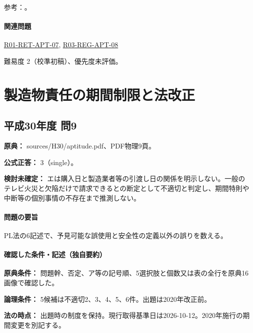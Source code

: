 \par 参考：\cite{pl_statute,pl_qa,pl_definitions2018,pl_nuclear_statute}。

\paragraph{関連問題} \hyperref[q:r01-ret-apt-07]{R01-RET-APT-07}, \hyperref[q:r03-reg-apt-08]{R03-REG-APT-08}

\par 難易度 2（校準初稿）、優先度未評価。

\section{製造物責任の期間制限と法改正}

\subsection{平成30年度 問9}
\label{q:h30-reg-apt-09}

\noindent\textbf{原典：} sources/H30/aptitude.pdf、PDF物理9頁。

\textbf{公式正答：} 3（single）。

\par\textbf{検討未確定：} エは購入日と製造業者等の引渡し日の関係を明示しない。一般のテレビ火災と欠陥だけで請求できるとの断定として不適切と判定し、期間特則や中断等の個別事情の不存在まで推測しない。

\paragraph{問題の要旨} PL法の6記述で、予見可能な誤使用と安全性の定義以外の誤りを数える。

\paragraph{確認した条件・記述（独自要約）}\mbox{}\par

\noindent\textbf{原典条件：} 問題幹、否定、ア等の記号順、5選択肢と個数又は表の全行を原典16画像で確認した。\par

\noindent\textbf{論理条件：} 5候補は不適切2、3、4、5、6件。出題は2020年改正前。\par

\noindent\textbf{法の時点：} 出題時の制度を保持。現行取得基準日は2026-10-12。2020年施行の期間変更を別記する。\par

